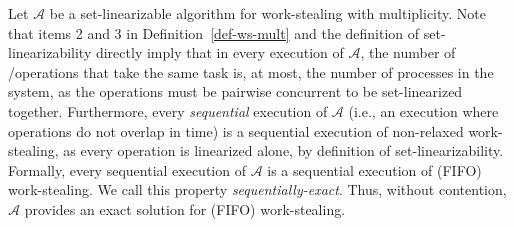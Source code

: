 
Let \(\mathcal A\) be a set-linearizable algorithm for work-stealing with multiplicity. Note that items 2 and 3 in Definition~\ref{def-ws-mult} and the definition of set-linearizability directly imply that in every execution of \(\mathcal A\), the number of \Take/\Steal operations that take the same task is, at most, the number of processes in the system, as the operations must be pairwise concurrent to be set-linearized together. Furthermore, every \emph{sequential} execution of \(\mathcal A\) (i.e., an execution where operations do not overlap in time) is a sequential execution of non-relaxed work-stealing, as every operation is linearized alone, by definition of set-linearizability. Formally, every sequential execution of \(\mathcal A\) is a sequential execution of (FIFO) work-stealing. We call this property \emph{sequentially-exact}.  Thus, without contention, \(\mathcal A\) provides an exact solution for (FIFO) work-stealing.

